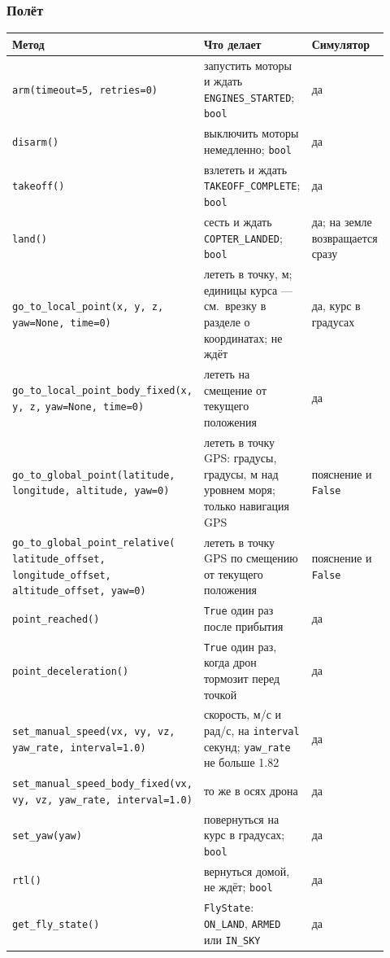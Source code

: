 \subsubsection*{Полёт}

{\footnotesize
\begin{longtable}{@{}>{\raggedright\arraybackslash}p{0.42\linewidth}>{\raggedright\arraybackslash}p{0.36\linewidth}>{\raggedright\arraybackslash}p{0.14\linewidth}@{}}
\toprule
\textbf{Метод} & \textbf{Что делает} & \textbf{Симулятор} \\
\midrule
\endhead
\verb|arm(timeout=5, retries=0)| & запустить моторы и ждать \verb|ENGINES_STARTED|; \verb|bool| & да \\
\verb|disarm()| & выключить моторы немедленно; \verb|bool| & да \\
\verb|takeoff()| & взлететь и ждать \verb|TAKEOFF_COMPLETE|; \verb|bool| & да \\
\verb|land()| & сесть и ждать \verb|COPTER_LANDED|; \verb|bool| & да; на земле возвращается сразу \\
\verb|go_to_local_point(x, y, z,| \verb|yaw=None, time=0)| & лететь в точку, м; единицы курса --- см.\ врезку в разделе о координатах; не ждёт & да, курс в градусах \\
\verb|go_to_local_point_body_fixed(x, y, z,| \verb|yaw=None, time=0)| & лететь на смещение от текущего положения & да \\
\verb|go_to_global_point(latitude,| \verb|longitude, altitude, yaw=0)| & лететь в точку GPS: градусы, градусы, м над уровнем моря; только навигация GPS & пояснение и \verb|False| \\
\verb|go_to_global_point_relative(| \verb|latitude_offset, longitude_offset,| \verb|altitude_offset, yaw=0)| & лететь в точку GPS по смещению от текущего положения & пояснение и \verb|False| \\
\verb|point_reached()| & \verb|True| один раз после прибытия & да \\
\verb|point_deceleration()| & \verb|True| один раз, когда дрон тормозит перед точкой & да \\
\verb|set_manual_speed(vx, vy, vz,| \verb|yaw_rate, interval=1.0)| & скорость, м/с и рад/с, на \verb|interval| секунд; \verb|yaw_rate| не больше 1.82 & да \\
\verb|set_manual_speed_body_fixed(vx,| \verb|vy, vz, yaw_rate, interval=1.0)| & то же в осях дрона & да \\
\verb|set_yaw(yaw)| & повернуться на курс в градусах; \verb|bool| & да \\
\verb|rtl()| & вернуться домой, не ждёт; \verb|bool| & да \\
\verb|get_fly_state()| & \verb|FlyState|: \verb|ON_LAND|, \verb|ARMED| или \verb|IN_SKY| & да \\
\bottomrule
\end{longtable}
}

